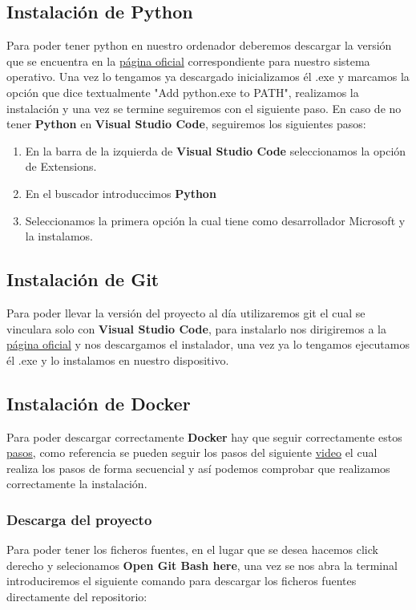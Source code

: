 \subsection{Instalación de Python}
Para poder tener python en nuestro ordenador deberemos descargar la versión que se encuentra en la \href{https://www.python.org/downloads/}{página oficial} correspondiente para nuestro sistema operativo.
Una vez lo tengamos ya descargado inicializamos él .exe y marcamos la opción que dice textualmente  "Add python.exe to PATH", realizamos la instalación y una vez se termine seguiremos con el siguiente paso.
En caso de no tener \textbf{Python} en \textbf{Visual Studio Code}, seguiremos los siguientes pasos:
\begin{enumerate}
    \item En la barra de la izquierda de \textbf{Visual Studio Code} seleccionamos la opción de Extensions.
    \item En el buscador introduccimos \textbf{Python}
    \item Seleccionamos la primera opción la cual tiene como desarrollador Microsoft y la instalamos.
\end{enumerate}
\subsection{Instalación de Git}
Para poder llevar la versión del proyecto al día utilizaremos git el cual se vinculara solo con \textbf{Visual Studio Code}, para instalarlo nos dirigiremos a la \href{https://git-scm.com/download/win}{página oficial} y nos descargamos el instalador, una vez ya lo tengamos ejecutamos él .exe y lo instalamos en nuestro dispositivo.
\subsection{Instalación de Docker}
\label{InstDocker}
Para poder descargar correctamente \textbf{Docker} hay que seguir correctamente estos \href{https://docs.docker.com/desktop/install/windows-install/}{pasos}, como referencia se pueden seguir los pasos del siguiente \href{https://www.youtube.com/watch?v=ZO4KWQfUBBc}{video} el cual realiza los pasos de forma secuencial y así podemos comprobar que realizamos correctamente la instalación.
\subsubsection{Descarga del proyecto}
Para poder tener los ficheros fuentes, en el lugar que se desea hacemos click derecho y selecionamos \textbf{Open Git Bash here}, una vez se nos abra la terminal introduciremos el siguiente comando para descargar los ficheros fuentes directamente del repositorio:

